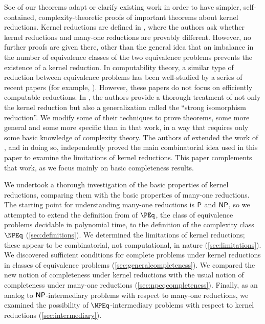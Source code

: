 Soe of our theorems adapt or clarify existing work in order to have simpler, self-contained, complexity-theoretic proofs of important theorems about kernel reductions.
Kernel reductions are defined in \autocite{fg09}, where the authors ask whether kernel reductions and many-one reductions are provably different.
However, no further proofs are given there, other than the general idea that an imbalance in the number of equivalence classes of the two equivalence problems prevents the existence of a kernel reduction.
In computability theory, a similar type of reduction between equivalence problems has been well-studied by a series of recent papers (for example, \autocite{gg01, ff12, ffn12, chm12, imnn13, almnss14, mn14}).
However, these papers do not focus on efficiently computable reductions.
In \autocite{bcffm}, the authors provide a thorough treatment of not only the kernel reduction but also a generalization called the ``strong isomorphism reduction''.
We modify some of their techniques to prove theorems, some more general and some more specific than in that work, in a way that requires only some basic knowledge of complexity theory.
The authors of \autocite{gz14} extended the work of \autocite{bcffm}, and in doing so, independently proved the main combinatorial idea used in this paper to examine the limitations of kernel reductions.
This paper complements that work, as we focus mainly on basic completeness results.

We undertook a thorough investigation of the basic properties of kernel reductions, comparing them with the basic properties of many-one reductions.
The starting point for understanding many-one reductions is $\P$ and $\NP$, so we attempted to extend the definition from \autocite{fg09} of $\PEq$, the class of equivalence problems decidable in polynomial time, to the definition of the complexity class $\NPEq$ (\autoref{sec:definitions}).
We determined the limitations of kernel reductions; these appear to be combinatorial, not computational, in nature (\autoref{sec:limitations}).
We discovered sufficient conditions for complete problems under kernel reductions in classes of equivalence problems (\autoref{sec:generalcompleteness}).
We compared the new notion of completeness under kernel reductions with the usual notion of completeness under many-one reductions (\autoref{sec:npeqcompleteness}).
Finally, as an analog to $\NP$-intermediary problems with respect to many-one reductions, we examined the possibility of $\NPEq$-intermediary problems with respect to kernel reductions (\autoref{sec:intermediary}).

